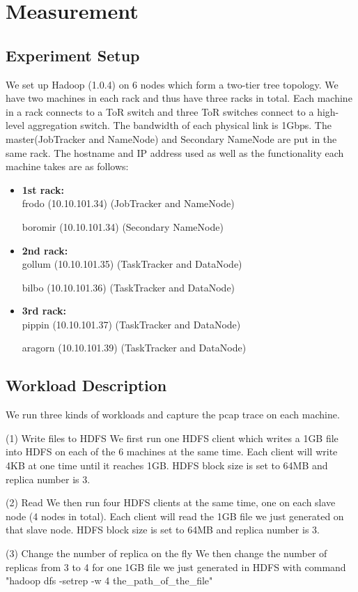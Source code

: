 \section{Measurement}
\label{section:measurement}


\subsection{\bf Experiment Setup}
We set up Hadoop (1.0.4) on 6 nodes which form a two-tier tree topology. We have two machines in each rack and thus have three racks in total. Each machine in a rack connects to a ToR switch and three ToR switches connect to a high-level aggregation switch. The bandwidth of each physical link is 1Gbps. The master(JobTracker and NameNode) and Secondary NameNode are put in the same rack. The hostname and IP address used as well as the functionality each machine takes are as follows:
\begin{itemize}
\item {\bf 1st rack:}
\\
frodo (10.10.101.34) (JobTracker and NameNode)

boromir (10.10.101.34) (Secondary NameNode)

\item {\bf 2nd rack:}
\\
gollum (10.10.101.35) (TaskTracker and DataNode)

bilbo (10.10.101.36)	(TaskTracker and DataNode)

\item {\bf 3rd rack:}
\\
pippin (10.10.101.37)	(TaskTracker and DataNode)

aragorn (10.10.101.39)	(TaskTracker and DataNode)
\end{itemize}

\subsection{\bf Workload Description}
We run three kinds of workloads and capture the pcap trace on each machine.

(1) Write files to HDFS
We first run one HDFS client which writes a 1GB file into HDFS on each of the 6 machines at the same time. Each client will write 4KB at one time until it reaches 1GB. HDFS block size is set to 64MB and replica number is 3.

(2) Read
We then run four HDFS clients at the same time, one on each slave node (4 nodes in total). Each client will read the 1GB file we just generated on that slave node. HDFS block size is set to 64MB and replica number is 3.

(3) Change the number of replica on the fly
We then change the number of replicas from 3 to 4 for one 1GB file we just generated in HDFS with command "hadoop dfs -setrep -w 4 the\_path\_of\_the\_file"



